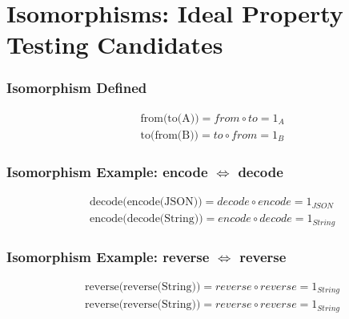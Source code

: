 \documentclass{beamer}
\begin{document}
\section{Isomorphisms: Ideal Property Testing Candidates}
\begin{frame}[fragile]
\frametitle{Isomorphism Defined}
\medskip
\begin{equation*}
\begin{aligned}
& \text{from(to(A))} = from \circ to = 1_A \\
& \text{to(from(B))} = to \circ from = 1_B
\end{aligned}
\end{equation*}
\end{frame}

\begin{frame}[fragile]
\frametitle{Isomorphism Example: encode {$\iff$} decode}
\medskip
\begin{equation*}
\begin{aligned}
& \text{decode(encode(JSON))} = decode \circ encode = 1_{JSON} \\
& \text{encode(decode(String))} = encode \circ decode = 1_{String}
\end{aligned}
\end{equation*}
\end{frame}

\begin{frame}[fragile]
\frametitle{Isomorphism Example: reverse {$\iff$} reverse}
\medskip
\begin{equation*}
\begin{aligned}
& \text{reverse(reverse(String))} = reverse \circ reverse = 1_{String} \\
& \text{reverse(reverse(String))} = reverse \circ reverse = 1_{String} \\
\end{aligned}
\end{equation*}
\end{frame}
\end{document}
